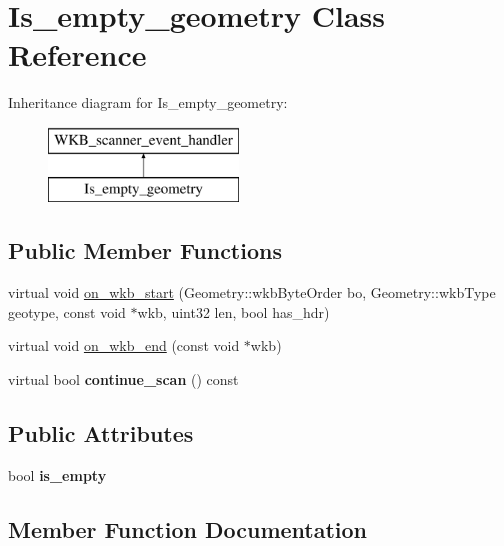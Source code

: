 \hypertarget{classIs__empty__geometry}{}\section{Is\+\_\+empty\+\_\+geometry Class Reference}
\label{classIs__empty__geometry}
Inheritance diagram for Is\+\_\+empty\+\_\+geometry\+:\begin{figure}[H]
\begin{center}
\leavevmode
\includegraphics[height=2.000000cm]{classIs__empty__geometry}
\end{center}
\end{figure}
\subsection*{Public Member Functions}
\begin{DoxyCompactItemize}
\item 
virtual void \mbox{\hyperlink{classIs__empty__geometry_a30bc84d35b5a414d1366b57a6ba02f2e}{on\+\_\+wkb\+\_\+start}} (Geometry\+::wkb\+Byte\+Order bo, Geometry\+::wkb\+Type geotype, const void $\ast$wkb, uint32 len, bool has\+\_\+hdr)
\item 
virtual void \mbox{\hyperlink{classIs__empty__geometry_a9c4aa9285a264596e57a8c3018f6500a}{on\+\_\+wkb\+\_\+end}} (const void $\ast$wkb)
\item 
\mbox{\label{classIs__empty__geometry_ad1e1e725be3f12a273abd8250c8527a7}} 
virtual bool {\bfseries continue\+\_\+scan} () const
\end{DoxyCompactItemize}
\subsection*{Public Attributes}
\begin{DoxyCompactItemize}
\item 
\mbox{\label{classIs__empty__geometry_abf8322262ac3ca8e2366652b7ad431ad}} 
bool {\bfseries is\+\_\+empty}
\end{DoxyCompactItemize}


\subsection{Member Function Documentation}
\mbox{\label{classIs__empty__geometry_a9c4aa9285a264596e57a8c3018f6500a}} 
